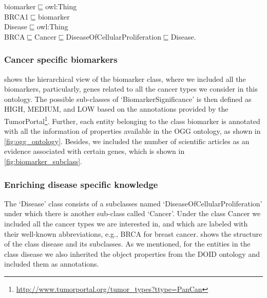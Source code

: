 \vspace{-4mm}
{\scriptsize \noindent biomarker$\sqsubseteq$owl:Thing \\
BRCA1$\sqsubseteq$biomarker\\
Disease$\sqsubseteq$owl:Thing\\
BRCA$\sqsubseteq$Cancer$\sqsubseteq$DiseaseOfCellularProliferation$\sqsubseteq$Disease.}\\
\vspace{-4mm}

\subsubsection{Cancer specific biomarkers}
 shows the hierarchical view of the biomarker class, where we included all the biomarkers, particularly, genes related to all the cancer types we consider in this ontology. The possible sub-classes of `BiomarkerSignificance' is then defined as HIGH, MEDIUM, and LOW based on the annotations provided by the TumorPortal\footnote{\url{http://www.tumorportal.org/tumor_types?ttype=PanCan}}. Further, each entity belonging to the class biomarker is annotated with all the information of properties available in the OGG ontology, as shown in \cref{fig:ogg_ontology}. Besides, we included the number of scientific articles as an evidence associated with certain genes, which is shown in \cref{fig:biomarker_subclass}.

\subsubsection{Enriching disease specific knowledge}
The `Disease' class consists of a subclasses named  `DiseaseOfCellularProliferation' under which there is another sub-class called `Cancer'. Under the class Cancer we included all the cancer types we are interested in, and which are labeled with their well-known abbreviations, e.g., BRCA for breast cancer.  shows the structure of the class disease and its subclasses. As we mentioned, for the entities in the class disease we also inherited the object properties from the DOID ontology and included them as annotations. 

